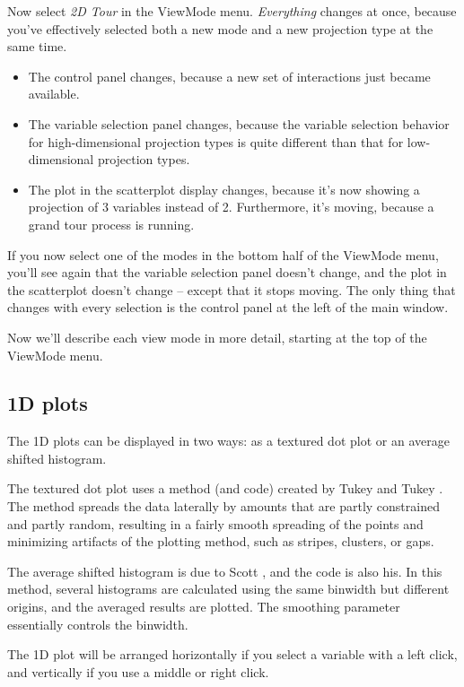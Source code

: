 \documentclass[11pt]{article}
\begin{document}
Now select {\em 2D Tour} in the ViewMode menu.  {\em Everything}
changes at once, because you've effectively selected both a new mode and
a new projection type at the same time.
\begin{itemize}
\itemsep 0em
\item The control panel changes, because a new set of interactions
      just became available.
\item The variable selection panel changes, because the variable
      selection behavior for high-dimensional projection types is
      quite different than that for low-dimensional projection types.
\item The plot in the scatterplot display changes, because it's
      now showing a projection of 3 variables instead of 2.  Furthermore,
      it's moving, because a grand tour process is running.
\end{itemize}

If you now select one of the modes in the bottom half of the ViewMode
menu, you'll see again that the variable selection panel doesn't
change, and the plot in the scatterplot doesn't change -- except
that it stops moving.  The only thing that changes with every
selection is the control panel at the left of the main window.

Now we'll describe each view mode in more detail, starting at the
top of the ViewMode menu. 

\subsection{1D plots}

The 1D plots can be displayed in two ways:  as a textured dot plot
or an average shifted histogram.

The textured dot plot uses a method (and code) created by Tukey and Tukey
\cite{TukeyTukey90TM}.  The method spreads the data laterally by
amounts that are partly constrained and partly random, resulting in a
fairly smooth spreading of the points and minimizing artifacts of the
plotting method, such as stripes, clusters, or gaps.

The average shifted histogram is due to Scott \cite{Scott92},
and the code is also his.  In this method, several histograms are
calculated using the same binwidth but different origins, and the
averaged results are plotted.  The smoothing parameter essentially
controls the binwidth.

The 1D plot will be arranged horizontally if you select a variable
with a left click, and vertically if you use a middle or right click.
\end{document}
